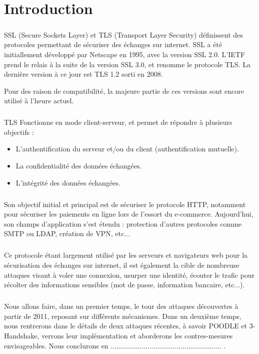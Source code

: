 \chapter*{Introduction}

\paragraph{}
SSL (Secure Sockets Layer) et TLS (Transport Layer Security) définissent des protocoles 
permettant de sécuriser des échanges sur internet. SSL a été initiallement développé 
par Netscape en 1995, avec la version SSL 2.0. L'IETF prend le relais à la suite de la 
version SSL 3.0, et renomme le protocole TLS. La dernière version à ce jour est 
TLS 1.2 sorti en 2008.

Pour des raison de compatibilité, la majeure partie de ces versions sont 
encore utilisé à l'heure actuel.

\paragraph{}
TLS Fonctionne en mode client-serveur, et permet de répondre à plusieurs objectifs :
\begin{itemize}
\item L'authentification du serveur et/ou du client (authentification mutuelle).
\item La confidentialité des données échangées.
\item L'intégrité des données échangées.
\end{itemize}



\paragraph{}
Son objectif initial et principal est de sécuriser le protocole HTTP, 
notamment pour sécuriser les paiements en ligne lors de l'essort du e-commerce. 
Aujourd'hui, son champs d'application s'est étendu : protection d'autres 
protocoles comme SMTP ou LDAP, création de VPN, etc...

\paragraph{}
Ce protocole étant largement utilisé par les serveurs et navigateurs web 
pour la sécurisation des échanges sur internet, 
il est également la cible de nombreuse attaques visant à voler une connexion, 
usurper une identité, écouter le trafic pour récolter des informations sensibles 
(mot de passe, information bancaire, etc...).

\paragraph{}
Nous allons faire, dans un premier temps, 
le tour des attaques découvertes à partir de 2011, reposant sur différents mécanismes. 
Dans un deuxième temps, nous rentrerons dans le détails de deux attaques récentes, 
à savoir POODLE et 3-Handshake, verrons leur implémentation et aborderons 
les contres-mesures envisageables. 
Nous conclurons en ......................................................... .

